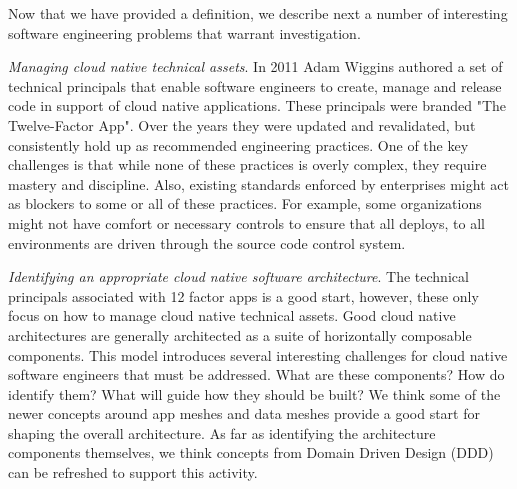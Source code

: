 \documentclass[conference]{IEEEtran}
\begin{document}
Now that we have provided a definition, we describe next a number of interesting software engineering problems that warrant investigation.

\textit{Managing cloud native technical assets}.  In 2011 Adam Wiggins authored a set of technical principals that enable software engineers to create, manage and release code in support of cloud native applications. These principals were branded "The Twelve-Factor App"\cite{12factor}.  Over the years they were updated and revalidated\cite{hoffman2016beyond, 12factorRevisited}, but consistently hold up as recommended engineering practices. One of the key challenges is that while none of these practices is overly complex, they require mastery and discipline. Also, existing standards enforced by enterprises might act as blockers to some or all of these practices.  For example, some organizations might not have comfort or necessary controls to ensure that all deploys, to all environments are driven through the source code control system.

\textit{Identifying an appropriate cloud native software architecture}.  The technical principals associated with 12 factor apps is a good start, however, these only focus on how to manage cloud native technical assets.  Good cloud native architectures are generally architected as a suite of horizontally composable components. This model introduces several interesting challenges for cloud native software engineers that must be addressed. What are these components? How do identify them? What will guide how they should be built? We think some of the newer concepts around app meshes\cite{GartnerMASA} and data meshes\cite{datamesh} provide a good start for shaping the overall architecture.  As far as identifying the architecture components themselves, we think concepts from Domain Driven Design (DDD)\cite{evans2004domain, vernon2013implementing} can be refreshed to support this activity.
\end{document}
